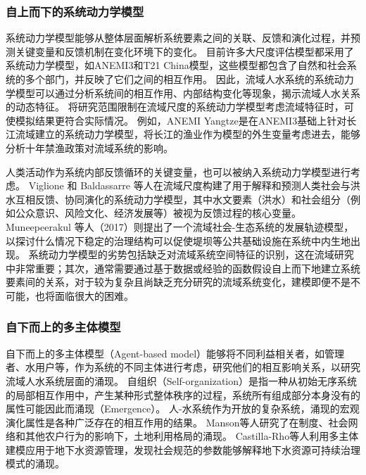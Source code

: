 \subsubsection*{自上而下的系统动力学模型}

系统动力学模型能够从整体层面解析系统要素之间的关联、反馈和演化过程\cite{jaeger2017}，并预测关键变量和反馈机制在变化环境下的变化\cite{vaighan2017}。
目前许多大尺度评估模型都采用了系统动力学模型，如ANEMI3和T21 China模型，这些模型都包含了自然和社会系统的多个部门，并反映了它们之间的相互作用\cite{breach2021, qu2020}。
因此，流域人水系统的系统动力学模型可以通过分析系统间的相互作用、内部结构变化等现象，揭示流域人水关系的动态特征。
将研究范围限制在流域尺度的系统动力学模型考虑流域特征时，可使模拟结果更符合实际情况。
例如，ANEMI Yangtze是在ANEMI3基础上针对长江流域建立的系统动力学模型\cite{jiang2022}，将长江的渔业作为模型的外生变量考虑进去，能够分析十年禁渔政策对流域系统的影响\cite{jiang2022}。

人类活动作为系统内部反馈循环的关键变量，也可以被纳入系统动力学模型进行考虑。
Viglione 和 Baldassarre 等人在流域尺度构建了用于解释和预测人类社会与洪水互相反馈、协同演化的系统动力学模型\cite{viglione2014,dibaldassarre2015}，其中水文要素（洪水）和社会组分（例如公众意识、风险文化、经济发展等）被视为反馈过程的核心变量\cite{song2021a,ciullo2017}。
Muneepeerakul 等人（2017）则提出了一个流域社会-生态系统的发展轨迹模型，以探讨什么情况下稳定的治理结构可以促使堤坝等公共基础设施在系统中内生地出现\cite{muneepeerakul2017}。
系统动力学模型的劣势包括缺乏对流域系统空间特征的识别，这在流域研究中非常重要；其次，通常需要通过基于数据或经验的函数假设自上而下地建立系统要素间的关系，对于较为复杂且尚缺乏充分研究的流域系统变化，建模即便不是不可能，也将面临很大的困难。

\subsubsection*{自下而上的多主体模型}

自下而上的多主体模型（Agent-based model）能够将不同利益相关者，如管理者、水用户等，作为系统的不同主体进行考虑，研究他们的相互影响关系，以研究流域人水系统层面的涌现\cite{biggs2021}。
自组织（Self-organization）是指一种从初始无序系统的局部相互作用中，产生某种形式整体秩序的过程\cite{berkes2008}，系统所有组成部分本身没有的属性可能因此而涌现（Emergence）。
人-水系统作为开放的复杂系统，涌现的宏观演化属性是各种广泛存在的相互作用的结果\cite{schluter2019}。
Manson等人研究了在制度、社会网络和其他农户行为的影响下，土地利用格局的涌现\cite{manson2016}。
Castilla-Rho等人利用多主体建模应用于地下水资源管理，发现社会规范的参数能够解释地下水资源可持续治理模式的涌现\cite{castilla-rho2017a,castilla-rho2015,castilla-rho2019,castilla-rho2017}。

